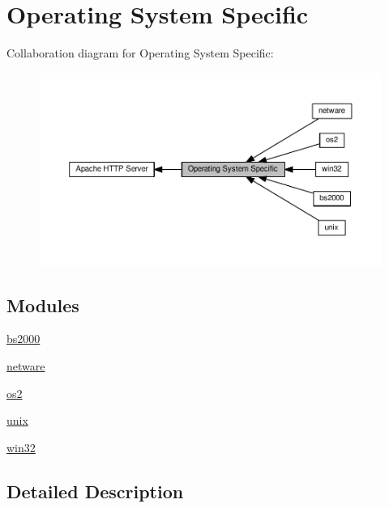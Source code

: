 \hypertarget{group__APACHE__OS}{}\section{Operating System Specific}
\label{group__APACHE__OS}
Collaboration diagram for Operating System Specific\+:
\nopagebreak
\begin{figure}[H]
\begin{center}
\leavevmode
\includegraphics[width=350pt]{group__APACHE__OS}
\end{center}
\end{figure}
\subsection*{Modules}
\begin{DoxyCompactItemize}
\item 
\hyperlink{group__APACHE__OS__BS2000}{bs2000}
\item 
\hyperlink{group__APACHE__OS__NETWARE}{netware}
\item 
\hyperlink{group__APACHE__OS__OS2}{os2}
\item 
\hyperlink{group__APACHE__OS__UNIX}{unix}
\item 
\hyperlink{group__APACHE__OS__WIN32}{win32}
\end{DoxyCompactItemize}


\subsection{Detailed Description}
